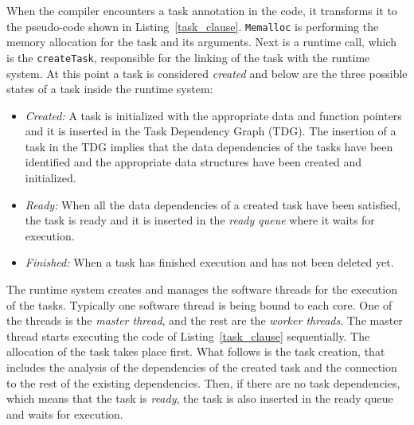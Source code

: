 When the compiler encounters a task annotation in the code, it transforms it to the pseudo-code shown in Listing~\ref{task_clause}.
\texttt{Memalloc} is performing the memory allocation for the task and its arguments.
Next is a runtime call, which is the \texttt{createTask}, responsible for the linking of the task with the runtime system.
At this point a task is considered \textit{created} and below are the three possible states of a task inside the runtime system:
\begin{itemize}
\item \textit{Created:} A task is initialized with the appropriate data and function pointers and it is inserted in the Task Dependency Graph (TDG). The insertion of a task in the TDG implies that the data dependencies of the tasks have been identified and the appropriate data structures have been created and initialized. 
\item \textit{Ready:} When all the data dependencies of a created task have been satisfied, the task is ready and it is inserted in the \textit{ready queue} where it waits for execution. 
\item \textit{Finished:} When a task has finished execution and has not been deleted yet.
\end{itemize}

The runtime system creates and manages the software threads for the execution of the tasks. 
Typically one software thread is being bound to each core. 
One of the threads is the \textit{master thread}, and the rest are the \textit{worker threads}. 
The master thread starts executing the code of Listing~\ref{task_clause} sequentially. 
The allocation of the task takes place first.
What follows is the task creation, that includes the analysis of the dependencies of the created task and the connection to the rest of the existing dependencies.
Then, if there are no task dependencies, which means that the task is \textit{ready}, the task is also inserted in the ready queue and waits for execution.

